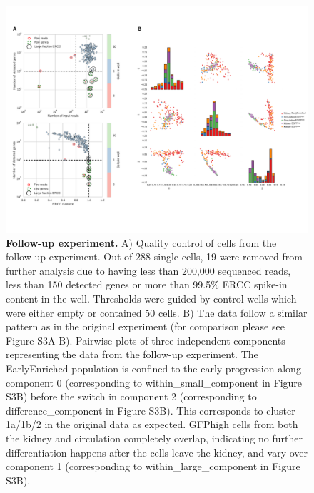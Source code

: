 \begin{figure}
    \centering
    \includegraphics[width=\textwidth]{"SF6"}
    \caption[Follow-up experiment]{\textbf{Follow-up experiment.} A) Quality control of cells from the follow-up experiment. Out of 288 single cells, 19 were removed from further analysis due to having less than 200,000 sequenced reads, less than 150 detected genes or more than 99.5\% ERCC spike-in content in the well. Thresholds were guided by control wells which were either empty or contained 50 cells. B) The data follow a similar pattern as in the original experiment (for comparison please see Figure S3A-B). Pairwise plots of three independent components representing the data from the follow-up experiment. The EarlyEnriched population is confined to the early progression along component 0 (corresponding to within\_small\_component in Figure S3B) before the switch in component 2 (corresponding to difference\_component in Figure S3B). This corresponds to cluster 1a/1b/2 in the original data as expected. GFPhigh cells from both the kidney and circulation completely overlap, indicating no further differentiation happens after the cells leave the kidney, and vary over component 1 (corresponding to within\_large\_component in Figure S3B).}
    \label{fig:rep-qc}
\end{figure}

